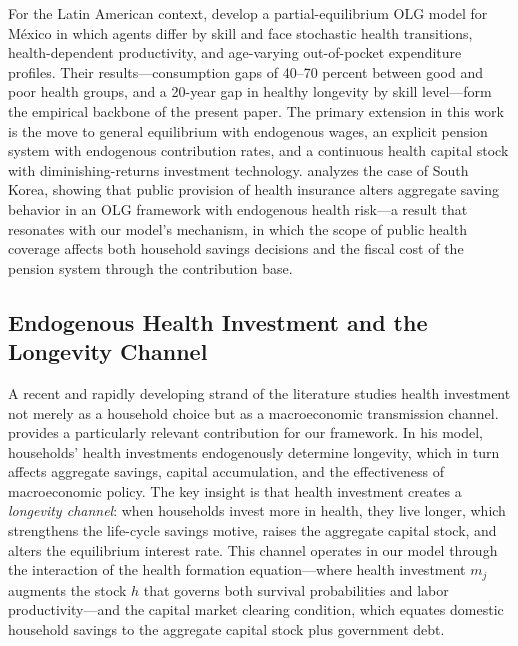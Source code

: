\documentclass[12pt,a4paper]{article}
\begin{document}
For the Latin American context, \citet{CortesEtAl2024} develop a partial-equilibrium OLG model for M\'exico in which agents differ by skill and face stochastic health transitions, health-dependent productivity, and age-varying out-of-pocket expenditure profiles. Their results---consumption gaps of 40--70 percent between good and poor health groups, and a 20-year gap in healthy longevity by skill level---form the empirical backbone of the present paper. The primary extension in this work is the move to general equilibrium with endogenous wages, an explicit pension system with endogenous contribution rates, and a continuous health capital stock with diminishing-returns investment technology. \citet{Lim2020} analyzes the case of South Korea, showing that public provision of health insurance alters aggregate saving behavior in an OLG framework with endogenous health risk---a result that resonates with our model's mechanism, in which the scope of public health coverage affects both household savings decisions and the fiscal cost of the pension system through the contribution base.

\subsection{Endogenous Health Investment and the Longevity Channel}
\label{subsec:lit_longevity}

A recent and rapidly developing strand of the literature studies health investment not merely as a household choice but as a macroeconomic transmission channel. \citet{Carrasco2026} provides a particularly relevant contribution for our framework. In his model, households' health investments endogenously determine longevity, which in turn affects aggregate savings, capital accumulation, and the effectiveness of macroeconomic policy. The key insight is that health investment creates a \textit{longevity channel}: when households invest more in health, they live longer, which strengthens the life-cycle savings motive, raises the aggregate capital stock, and alters the equilibrium interest rate. This channel operates in our model through the interaction of the health formation equation---where health investment $m_j$ augments the stock $h$ that governs both survival probabilities and labor productivity---and the capital market clearing condition, which equates domestic household savings to the aggregate capital stock plus government debt.
\end{document}
